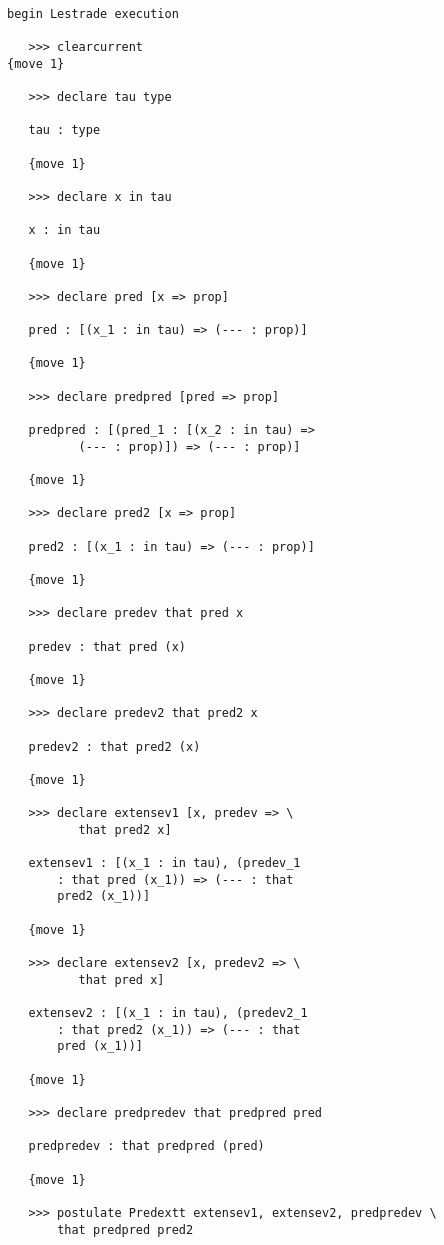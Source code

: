 \documentclass[12pt]{article}
\begin{document}
\begin{verbatim}

begin Lestrade execution

   >>> clearcurrent
{move 1}

   >>> declare tau type

   tau : type

   {move 1}

   >>> declare x in tau

   x : in tau

   {move 1}

   >>> declare pred [x => prop]

   pred : [(x_1 : in tau) => (--- : prop)]

   {move 1}

   >>> declare predpred [pred => prop]

   predpred : [(pred_1 : [(x_2 : in tau) => 
          (--- : prop)]) => (--- : prop)]

   {move 1}

   >>> declare pred2 [x => prop]

   pred2 : [(x_1 : in tau) => (--- : prop)]

   {move 1}

   >>> declare predev that pred x

   predev : that pred (x)

   {move 1}

   >>> declare predev2 that pred2 x

   predev2 : that pred2 (x)

   {move 1}

   >>> declare extensev1 [x, predev => \
          that pred2 x]

   extensev1 : [(x_1 : in tau), (predev_1 
       : that pred (x_1)) => (--- : that 
       pred2 (x_1))]

   {move 1}

   >>> declare extensev2 [x, predev2 => \
          that pred x]

   extensev2 : [(x_1 : in tau), (predev2_1 
       : that pred2 (x_1)) => (--- : that 
       pred (x_1))]

   {move 1}

   >>> declare predpredev that predpred pred

   predpredev : that predpred (pred)

   {move 1}

   >>> postulate Predextt extensev1, extensev2, predpredev \
       that predpred pred2


\end{verbatim}
\end{document}
